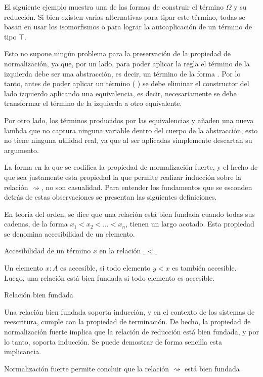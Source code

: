 \begin{example}
	El siguiente ejemplo muestra una de las formas de construir el término $\Omega$ y su reducción.
	Si bien existen varias alternativas para tipar este término, todas se basan en usar los isomorfismos  o  para lograr la autoaplicación de un término de tipo $\top$.
	
	Esto no supone ningún problema para la preservación de la propiedad de normalización, ya que, por un lado, para poder aplicar la regla  el término de la izquierda debe ser una abstracción, es decir, un término de la forma  .
	Por lo tanto, antes de poder aplicar un término (\const{[}  \const{]≡} )   se debe eliminar el constructor  del lado izquierdo aplicando una equivalencia, es decir, necesariamente se debe transformar el término de la izquierda a otro equivalente.
	
	Por otro lado, los términos producidos por las equivalencias  y  añaden una nueva lambda que no captura ninguna variable dentro del cuerpo de la abstracción, esto no tiene ninguna utilidad real, ya que al ser aplicadas simplemente descartan su argumento.
	
\end{example}

La forma en la que se codifica la propiedad de normalización fuerte, y el hecho de que sea justamente esta propiedad la que permite realizar inducción sobre la relación $\rightsquigarrow$, no son casualidad.
Para entender los fundamentos que se esconden detrás de estas observaciones se presentan las siguientes definiciones.

En teoría del orden, se dice que una relación está bien fundada cuando todas sus cadenas, de la forma $x_1 < x_2 < \dots < x_n$, tienen un largo acotado.
Esta propiedad se denomina accesibilidad de un elemento.

\begin{codigo}
	Accesibilidad de un término $x$ en la relación $\_<\_$
\end{codigo}

Un elemento $x: A$ es accesible, si todo elemento $y < x$ es también accesible.
Luego, una relación está bien fundada si todo elemento es accesible.

\begin{codigo}
	Relación bien fundada
\end{codigo}

Una relación bien fundada soporta inducción, y en el contexto de los sistemas de reescritura, cumple con la propiedad de terminación.
De hecho, la propiedad de normalización fuerte implica que la relación de reducción está bien fundada, y por lo tanto, soporta inducción.
Se puede demostrar de forma sencilla esta implicancia.

\begin{codigo}
	Normalización fuerte permite concluir que la relación $\rightsquigarrow$ está bien fundada
\end{codigo} 
